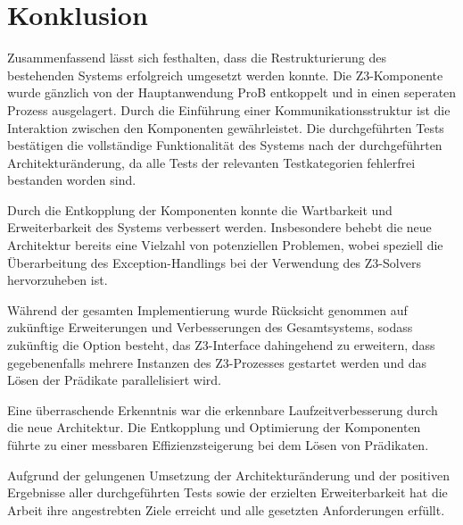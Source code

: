 

\section{Konklusion}

Zusammenfassend lässt sich festhalten, dass die Restrukturierung des bestehenden Systems erfolgreich umgesetzt werden konnte.
Die Z3-Komponente wurde gänzlich von der Hauptanwendung ProB entkoppelt und in einen seperaten Prozess ausgelagert.
Durch die Einführung einer Kommunikationsstruktur ist die Interaktion zwischen den Komponenten gewährleistet.
Die durchgeführten Tests bestätigen die vollständige Funktionalität des Systems nach der durchgeführten Architekturänderung,
da alle Tests der relevanten Testkategorien fehlerfrei bestanden worden sind.

Durch die Entkopplung der Komponenten konnte die Wartbarkeit und Erweiterbarkeit des Systems verbessert werden.
Insbesondere behebt die neue Architektur bereits eine Vielzahl von potenziellen Problemen,
wobei speziell die Überarbeitung des Exception-Handlings bei der Verwendung des Z3-Solvers hervorzuheben ist.

Während der gesamten Implementierung wurde Rücksicht genommen auf zukünftige Erweiterungen und Verbesserungen des Gesamtsystems,
sodass zukünftig die Option besteht, das Z3-Interface dahingehend zu erweitern, dass gegebenenfalls mehrere Instanzen des Z3-Prozesses gestartet werden und das Lösen der Prädikate parallelisiert wird.

Eine überraschende Erkenntnis war die erkennbare Laufzeitverbesserung durch die neue Architektur.
Die Entkopplung und Optimierung der Komponenten führte
zu einer messbaren Effizienzsteigerung bei dem Lösen von Prädikaten.

Aufgrund der gelungenen Umsetzung der Architekturänderung und der positiven Ergebnisse aller durchgeführten Tests
sowie der erzielten Erweiterbarkeit hat die Arbeit ihre angestrebten Ziele erreicht und alle gesetzten Anforderungen erfüllt.
